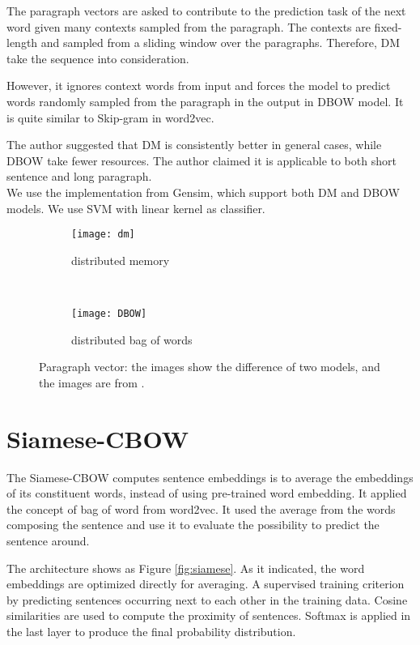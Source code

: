 The paragraph vectors are asked to contribute to the prediction task of the next word given many contexts sampled from the paragraph.
The contexts are fixed-length and sampled from a sliding window over the paragraphs. Therefore, DM take the sequence into consideration.

However, it ignores context words from input and forces the model to predict words randomly sampled from the paragraph in the output in DBOW model.
It is quite similar to Skip-gram in word2vec.

The author suggested that DM is consistently better in general cases, while DBOW take fewer resources. 
The author claimed it is applicable to both short sentence and long paragraph.\\

We use the implementation from Gensim, which support both DM and DBOW models. We use SVM with linear kernel as classifier.

\begin{figure}
\centering
\begin{subfigure}{.5\textwidth}
  \centering
  \texttt{[image: dm]}
  \caption{distributed memory}
  \label{fig:dm}
\end{subfigure}~
\begin{subfigure}{.5\textwidth}
  \centering
  \texttt{[image: DBOW]}
  \caption{distributed bag of words}
  \label{fig:dbow}
\end{subfigure}
\caption{Paragraph vector: the images show the difference of two models, and the images are from \cite{PVDM}.}
\label{fig:PVDM}
\end{figure}

\section{Siamese-CBOW}

The Siamese-CBOW\cite{kenter2016siamesecbow} computes sentence embeddings is to average the embeddings of its constituent words, instead of using pre-trained word embedding. It applied the concept of bag of word from word2vec. 
It used the average from the words composing the sentence and use it to evaluate the possibility to predict the sentence around. 

The architecture shows as Figure \ref{fig:siamese}. As it indicated, the word embeddings are optimized directly for averaging.
A supervised training criterion by predicting sentences occurring next to each other in the training data.
Cosine similarities are used to compute the proximity of sentences.
Softmax is applied in the last layer to produce the final probability distribution.

